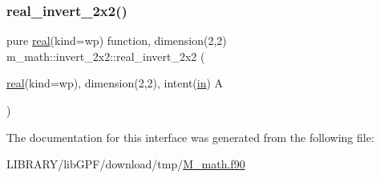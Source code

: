 \mbox{\label{interfacem__math_1_1invert__2x2_a2c3a267ed54a4db4e9393b03e74618fc}} 
\subsubsection{\texorpdfstring{real\+\_\+invert\+\_\+2x2()}{real\_invert\_2x2()}}
{\footnotesize\ttfamily pure \hyperlink{read__watch_83_8txt_abdb62bde002f38ef75f810d3a905a823}{real}(kind=wp) function, dimension(2,2) m\+\_\+math\+::invert\+\_\+2x2\+::real\+\_\+invert\+\_\+2x2 (\begin{DoxyParamCaption}\item[{\hyperlink{read__watch_83_8txt_abdb62bde002f38ef75f810d3a905a823}{real}(kind=wp), dimension(2,2), intent(\hyperlink{M__journal_83_8txt_afce72651d1eed785a2132bee863b2f38}{in})}]{A }\end{DoxyParamCaption})\hspace{0.3cm}{\ttfamily [private]}}



The documentation for this interface was generated from the following file\+:\begin{DoxyCompactItemize}
\item 
L\+I\+B\+R\+A\+R\+Y/lib\+G\+P\+F/download/tmp/\hyperlink{M__math_8f90}{M\+\_\+math.\+f90}\end{DoxyCompactItemize}
